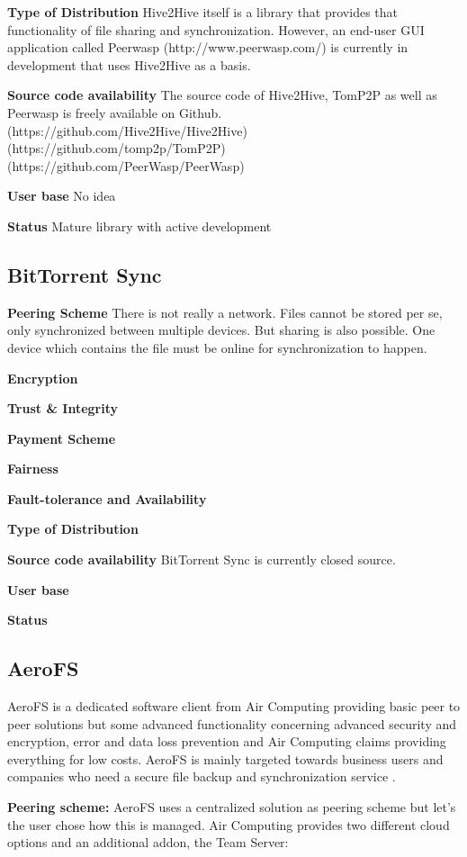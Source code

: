 \textbf{Type of Distribution}
Hive2Hive itself is a library that provides that functionality of file sharing and synchronization. However, an end-user GUI application called Peerwasp (http://www.peerwasp.com/) is currently in development that uses Hive2Hive as a basis.

\textbf{Source code availability}
The source code of Hive2Hive, TomP2P as well as Peerwasp is freely available on Github. (https://github.com/Hive2Hive/Hive2Hive) (https://github.com/tomp2p/TomP2P) (https://github.com/PeerWasp/PeerWasp)

\textbf{User base}
No idea

\textbf{Status}
Mature library with active development

\subsection{BitTorrent Sync} %

\textbf{Peering Scheme}
There is not really a network. Files cannot be stored per se, only synchronized between multiple devices. But sharing is also possible. One device which contains the file must be online for synchronization to happen.

\textbf{Encryption}

\textbf{Trust \& Integrity}

\textbf{Payment Scheme}

\textbf{Fairness}

\textbf{Fault-tolerance and Availability}

\textbf{Type of Distribution}

\textbf{Source code availability}
BitTorrent Sync is currently closed source.

\textbf{User base}

\textbf{Status}

\subsection{AeroFS} %
AeroFS is a dedicated software client from Air Computing providing basic peer to peer solutions but some advanced functionality concerning advanced security and encryption, error and data loss prevention and Air Computing claims providing everything for low costs. AeroFS is mainly targeted towards business users and companies who need a secure file backup and synchronization service \cite{aerofs}.

\textbf{Peering scheme:} AeroFS uses a centralized solution as peering scheme but let's the user chose how this is managed. Air Computing provides two different cloud options and an additional addon, the Team Server:

